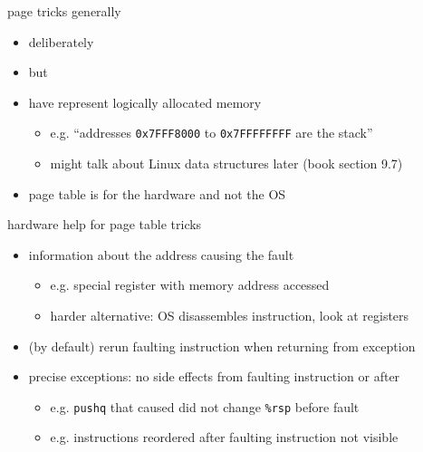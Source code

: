 \begin{frame}{page tricks generally}
\begin{itemize}
\item deliberately 
\item but 
\vspace{.5cm}
\item have  represent logically allocated memory
    \begin{itemize}
    \item e.g. ``addresses {\tt 0x7FFF8000} to {\tt 0x7FFFFFFFF} are the stack''
    \item might talk about Linux data structures later (book section 9.7)
    \end{itemize}
\item page table is for the hardware and not the OS
\end{itemize}
\end{frame}

\begin{frame}{hardware help for page table tricks}
\begin{itemize}
\item information about the address causing the fault
    \begin{itemize}
    \item e.g. special register with memory address accessed
    \item harder alternative: OS disassembles instruction, look at registers
    \end{itemize}
\item (by default) rerun faulting instruction when returning from exception
\item precise exceptions: no side effects from faulting instruction or after
    \begin{itemize}
    \item e.g. {\tt pushq} that caused did not change {\tt \%rsp} before fault
    \item e.g. instructions reordered after faulting instruction not visible
    \end{itemize}
\end{itemize}
\end{frame}
